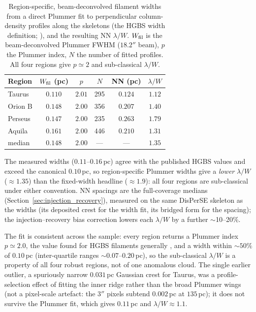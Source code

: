 \documentclass[usenatbib,twoside,twocolumn]{mnras}
\begin{document}
\begin{table}
\caption{Region-specific, beam-deconvolved filament widths from a direct Plummer fit to perpendicular column-density profiles along the skeletons (the HGBS width definition; \citealt{Arzoumanian2019}), and the resulting NN $\lambda/W$. $W_{\rm fil}$ is the beam-deconvolved Plummer FWHM ($18.2''$ beam), $p$ the Plummer index, $N$ the number of fitted profiles. All four regions give $p\simeq2$ and sub-classical $\lambda/W$.}
\label{tab:widths}
\footnotesize
\setlength{\tabcolsep}{3pt}
\begin{tabular}{p{1.7cm}ccccc}
\toprule
Region & $W_{\rm fil}$ (pc) & $p$ & $N$ & NN (pc) & $\lambda/W$ \\
\midrule
Taurus  & $0.110$ & $2.01$ & 295 & $0.124$ & $1.12$ \\
Orion B & $0.148$ & $2.00$ & 356 & $0.207$ & $1.40$ \\
Perseus & $0.147$ & $2.00$ & 235 & $0.263$ & $1.79$ \\
Aquila  & $0.161$ & $2.00$ & 446 & $0.210$ & $1.31$ \\
\midrule
median  & $0.148$ & $2.00$ & --- & --- & $1.35$ \\
\bottomrule
\end{tabular}
\par\vspace{2pt}
\footnotesize The measured widths ($0.11$--$0.16$\,pc) agree with the published HGBS values and exceed the canonical $0.10$\,pc, so region-specific Plummer widths give a \emph{lower} $\lambda/W$ ($\approx1.35$) than the fixed-width headline ($\approx1.9$): all four regions are sub-classical under either convention. NN spacings are the full-coverage medians (Section~\ref{sec:injection_recovery}), measured on the same DisPerSE skeleton as the widths (its deposited crest for the width fit, its bridged form for the spacing); the injection--recovery bias correction lowers each $\lambda/W$ by a further $\sim$10--20\%.
\end{table}

The fit is consistent across the sample: every region returns a Plummer index $p\simeq2.0$, the value found for HGBS filaments generally \citep{Arzoumanian2019}, and a width within $\sim50\%$ of $0.10$\,pc (inter-quartile ranges $\sim0.07$--$0.20$\,pc), so the sub-classical $\lambda/W$ is a property of all four robust regions, not of one anomalous cloud. The single earlier outlier, a spuriously narrow $0.031$\,pc Gaussian crest for Taurus, was a profile-selection effect of fitting the inner ridge rather than the broad Plummer wings (not a pixel-scale artefact: the $3''$ pixels subtend $0.002$\,pc at $135$\,pc); it does not survive the Plummer fit, which gives $0.11$\,pc and $\lambda/W\approx1.1$.
\end{document}
